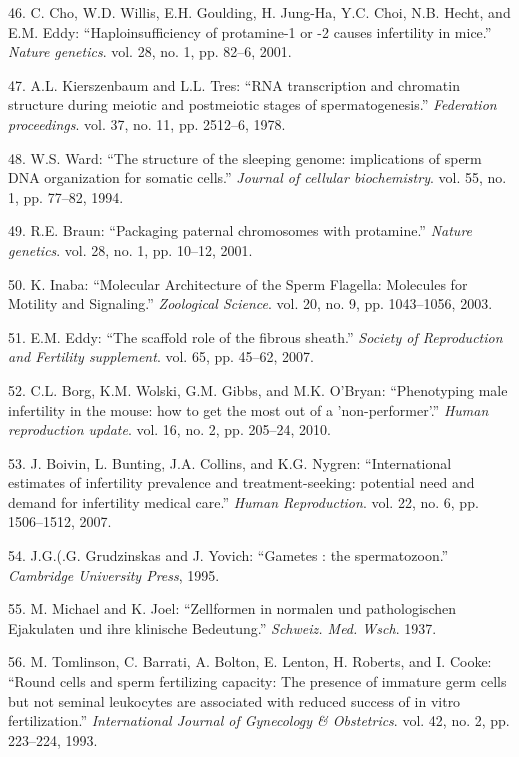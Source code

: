 \documentclass[12pt,a4paper,twoside]{ugathesis}
\theoremstyle{definition}
\theoremstyle{definition}
\theoremstyle{definition}
\theoremstyle{remark}
\begin{document}
\hypertarget{ref-Cho2001}{}
46. C. Cho, W.D. Willis, E.H. Goulding, H. Jung-Ha, Y.C. Choi, N.B.
Hecht, and E.M. Eddy: ``Haploinsufficiency of protamine-1 or -2 causes
infertility in mice.'' \emph{Nature genetics}. vol. 28, no. 1, pp.
82--6, 2001.

\hypertarget{ref-Kierszenbaum1978}{}
47. A.L. Kierszenbaum and L.L. Tres: ``RNA transcription and chromatin
structure during meiotic and postmeiotic stages of spermatogenesis.''
\emph{Federation proceedings}. vol. 37, no. 11, pp. 2512--6, 1978.

\hypertarget{ref-Ward1994}{}
48. W.S. Ward: ``The structure of the sleeping genome: implications of
sperm DNA organization for somatic cells.'' \emph{Journal of cellular
biochemistry}. vol. 55, no. 1, pp. 77--82, 1994.

\hypertarget{ref-Braun2001}{}
49. R.E. Braun: ``Packaging paternal chromosomes with protamine.''
\emph{Nature genetics}. vol. 28, no. 1, pp. 10--12, 2001.

\hypertarget{ref-Inaba2003}{}
50. K. Inaba: ``Molecular Architecture of the Sperm Flagella: Molecules
for Motility and Signaling.'' \emph{Zoological Science}. vol. 20, no. 9,
pp. 1043--1056, 2003.

\hypertarget{ref-Eddy2007}{}
51. E.M. Eddy: ``The scaffold role of the fibrous sheath.''
\emph{Society of Reproduction and Fertility supplement}. vol. 65, pp.
45--62, 2007.

\hypertarget{ref-Borg2010}{}
52. C.L. Borg, K.M. Wolski, G.M. Gibbs, and M.K. O'Bryan: ``Phenotyping
male infertility in the mouse: how to get the most out of a
'non-performer'.'' \emph{Human reproduction update}. vol. 16, no. 2, pp.
205--24, 2010.

\hypertarget{ref-Boivin2007a}{}
53. J. Boivin, L. Bunting, J.A. Collins, and K.G. Nygren:
``International estimates of infertility prevalence and
treatment-seeking: potential need and demand for infertility medical
care.'' \emph{Human Reproduction}. vol. 22, no. 6, pp. 1506--1512, 2007.

\hypertarget{ref-Grudzinskas1995}{}
54. J.G.(.G. Grudzinskas and J. Yovich: ``Gametes : the spermatozoon.''
\emph{Cambridge University Press}, 1995.

\hypertarget{ref-Michael1937}{}
55. M. Michael and K. Joel: ``Zellformen in normalen und pathologischen
Ejakulaten und ihre klinische Bedeutung.'' \emph{Schweiz. Med. Wsch}.
1937.

\hypertarget{ref-Tomlinson1993a}{}
56. M. Tomlinson, C. Barrati, A. Bolton, E. Lenton, H. Roberts, and I.
Cooke: ``Round cells and sperm fertilizing capacity: The presence of
immature germ cells but not seminal leukocytes are associated with
reduced success of in vitro fertilization.'' \emph{International Journal
of Gynecology \& Obstetrics}. vol. 42, no. 2, pp. 223--224, 1993.
\end{document}
